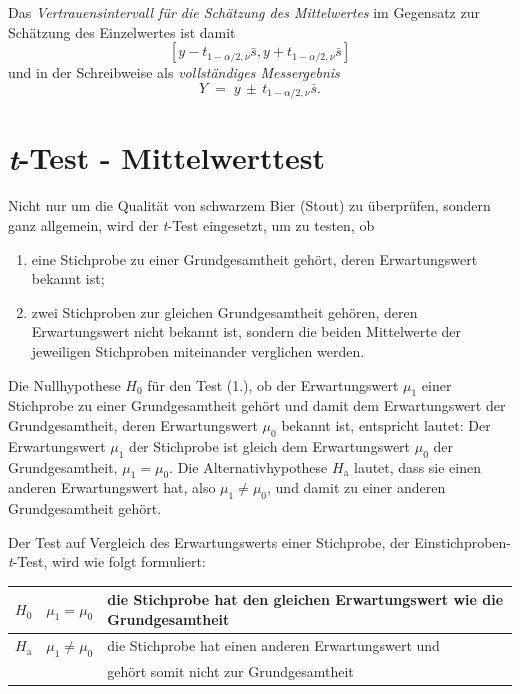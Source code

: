Das \textsl{Vertrauensintervall für die Schätzung des Mittelwertes} im Gegensatz zur
Schätzung des Einzelwertes ist damit
$$
[y - t_{1-\alpha/2,\nu} \bar s, y + t_{1-\alpha/2,\nu} \bar s]
$$
und in der Schreibweise als \textsl{vollständiges Messergebnis}
\begin{equation}
Y \; = \; y \, \pm \, t_{1-\alpha/2,\nu} \bar s .
\label{vollstaendigesErgebMittelwert}
\end{equation}




\section{\textsl{t}-Test - Mittelwerttest}


Nicht nur um die Qualität von schwarzem Bier (Stout) zu überprüfen, sondern ganz
allgemein, wird der \textsl{t}-Test eingesetzt, um zu testen, ob
\begin{enumerate}
\item eine Stichprobe zu einer Grundgesamtheit gehört,
 deren Erwartungswert bekannt ist;
\item zwei Stichproben zur gleichen Grundgesamtheit gehören,
 deren Erwartungswert nicht bekannt ist, sondern die beiden
 Mittelwerte der jeweiligen Stichproben miteinander verglichen werden.
\end{enumerate}

Die Nullhypothese $H_0$ für den Test (1.), ob der Erwartungswert $\mu_1$ einer
Stichprobe zu einer Grundgesamtheit gehört
und damit dem Erwartungswert der Grundgesamtheit, deren Erwartungswert $\mu_0$ bekannt ist,
entspricht lautet: Der Erwartungswert $\mu_1$ der Stichprobe
ist gleich dem  Erwartungswert $\mu_0$ der Grundgesamtheit, $\mu_1 = \mu_0$.
Die Alternativhypothese $H_\mathrm{a}$
lautet, dass sie einen anderen Erwartungswert hat, also $\mu_1 \neq \mu_0$,
und damit zu einer anderen Grundgesamtheit gehört.

Der Test auf Vergleich des Erwartungswerts einer Stichprobe, der Einstichproben-\textsl{t}-Test,
wird wie folgt formuliert:
\begin{center}
\begin{tabular}{c|cl}
$H_0$ & $\mu_1 = \mu_0$ & die Stichprobe hat den gleichen Erwartungswert wie die Grundgesamtheit\\
\hline
$H_\mathrm{a}$ & $\mu_1 \neq \mu_0$ & die Stichprobe hat einen anderen Erwartungswert und\\
 & & gehört somit nicht zur Grundgesamtheit
\end{tabular}
\end{center}

